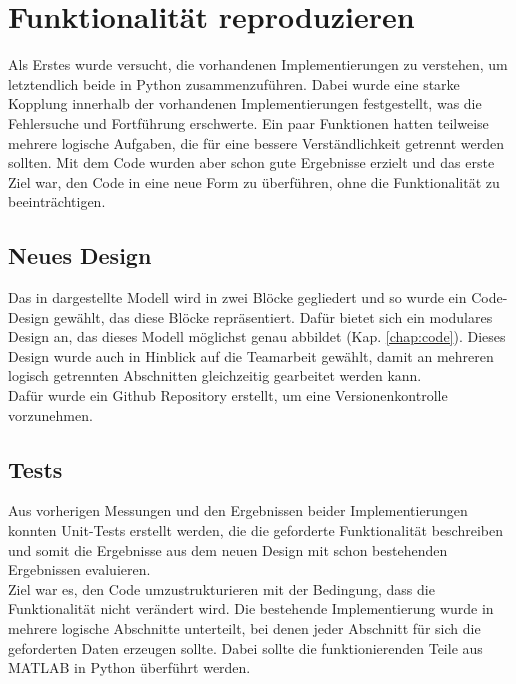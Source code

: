 \documentclass[../Report.tex]{subfiles}
\begin{document}
\section[Funktionalität reproduzieren]{Funktionalität reproduzieren}
\label{sec:vorg.reproduktion}
Als Erstes wurde versucht, die vorhandenen Implementierungen zu verstehen, um letztendlich beide in Python zusammenzuführen. Dabei wurde eine starke Kopplung innerhalb der vorhandenen Implementierungen festgestellt, was die Fehlersuche und Fortführung erschwerte. Ein paar Funktionen hatten teilweise mehrere logische Aufgaben, die für eine bessere Verständlichkeit getrennt werden sollten. Mit dem Code wurden aber schon gute Ergebnisse erzielt und das erste Ziel war, den Code in eine neue Form zu überführen, ohne die Funktionalität zu beeinträchtigen.
\subsection*{Neues Design}
\label{sec:vorg.design}
Das in  dargestellte Modell wird in zwei Blöcke gegliedert und so wurde ein Code-Design gewählt, das diese Blöcke repräsentiert. Dafür bietet sich ein modulares Design an, das dieses Modell möglichst genau abbildet (Kap. \ref{chap:code}). Dieses Design wurde auch in Hinblick auf die Teamarbeit gewählt, damit an mehreren logisch getrennten Abschnitten gleichzeitig gearbeitet werden kann. \\ Dafür wurde ein Github Repository erstellt, um eine Versionenkontrolle vorzunehmen.
\subsection*{Tests}
\label{sec:vorg.tests}
Aus vorherigen Messungen und den Ergebnissen beider Implementierungen konnten Unit-Tests erstellt werden, die die geforderte Funktionalität beschreiben und somit die Ergebnisse aus dem neuen Design mit schon bestehenden Ergebnissen evaluieren. \\ Ziel war es, den Code umzustrukturieren mit der Bedingung, dass die Funktionalität nicht verändert wird. Die bestehende Implementierung wurde in mehrere logische Abschnitte unterteilt, bei denen jeder Abschnitt für sich die geforderten Daten erzeugen sollte. Dabei sollte die funktionierenden Teile aus MATLAB in Python überführt werden.
\end{document}
